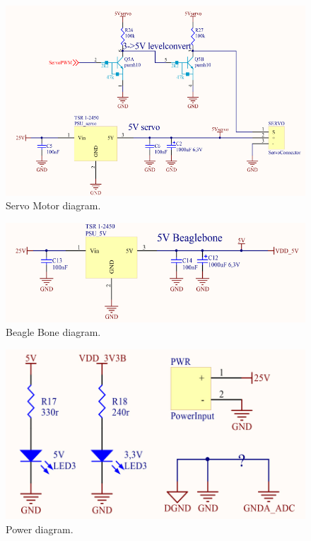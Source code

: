 \begin{figure}[H]
	\centering
	\includegraphics[scale=0.92]{figures/ServoMotor.pdf}
	\caption{Servo Motor diagram.}
	\label{labServoMotor}
\end{figure}\vspace{-5mm}

\begin{figure}[H]
	\centering
	\includegraphics[scale=0.92]{figures/BeagleBone.pdf}
	\caption{Beagle Bone diagram.}
	\label{labBeagleBone}
\end{figure}\vspace{-5mm}

\begin{figure}[H]
	\centering
	\includegraphics[scale=0.92]{figures/Power.pdf}
	\caption{Power diagram.}
	\label{labPower}
\end{figure}\vspace{-5mm}


